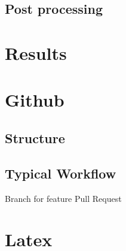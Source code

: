 \subsection{Post processing}



\section{Results}


\appendix
\section{Github}
\subsection{Structure}
\subsection{Typical Workflow}
Branch for feature
Pull Request

\section{Latex}

\section{}
